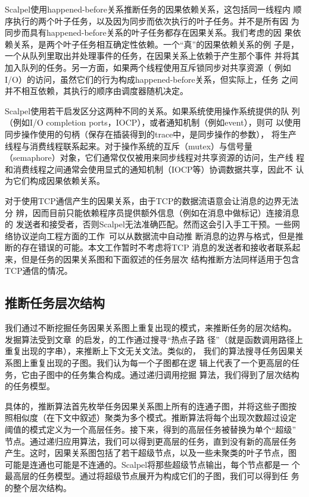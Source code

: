 Scalpel使用happened-before关系推断任务的因果依赖关系，这包括同一线程内
顺序执行的两个叶子任务，以及因为同步而依次执行的叶子任务。并不是所有因
为同步而具有happened-before关系的叶子任务都存在因果关系。我们考虑的因
果依赖关系，是两个叶子任务相互确定性依赖。一个“真”的因果依赖关系的例
子是，一个从队列里取出并处理事件的任务，在因果关系上依赖于产生那个事件
并将其加入队列的任务。另一方面，如果两个线程使用互斥锁同步对共享资源（
例如I/O）的访问，虽然它们的行为构成happened-before关系，但实际上，任务
之间并不相互依赖，其执行的顺序由调度器随机决定。

Scalpel使用若干启发区分这两种不同的关系。如果系统使用操作系统提供的队
列（例如I/O completion ports，IOCP），或者通知机制（例如event），则可
以使用同步操作使用的句柄（保存在插装得到的trace中，是同步操作的参数），
将生产线程与消费线程联系起来。对于操作系统的互斥（mutex）与信号量
（semaphore）对象，它们通常仅仅被用来同步线程对共享资源的访问，生产线
程和消费线程之间通常会使用显式的通知机制（IOCP等）协调数据共享，因此不
认为它们构成因果依赖关系。

对于使用TCP通信产生的因果关系，由于TCP的数据流语意会让消息的边界无法分
辨，因而目前只能依赖程序员提供额外信息（例如在消息中做标记）连接消息的
发送者和接受者，否则Scalpel无法准确匹配。然而这会引入手工干预。一些网
络协议逆向工程方面的工作~\cite{scalpel4, scalpel8}可以从数据流中自动推
断消息的边界与格式，但是推断的存在错误的可能。本文工作暂时不考虑将TCP
消息的发送者和接收者联系起来，但是任务的因果关系图和下面叙述的任务层次
结构推断方法同样适用于包含TCP通信的情况。

\subsection{推断任务层次结构}

我们通过不断挖掘任务因果关系图上重复出现的模式，来推断任务的层次结构。
发掘算法受到文章~\cite{wpp}的启发，\cite{wpp}的工作通过搜寻“热点子路
径”（就是函数调用路径上重复出现的字串），来推断上下文无关文法。类似的，
我们的算法搜寻任务因果关系图上重复出现的子图。我们认为每一个子图都在逻
辑上代表了一个更高层的任务，它由子图中的任务集合构成。通过递归调用挖掘
算法，我们得到了层次结构的任务模型。

具体的，推断算法首先枚举任务因果关系图上所有的连通子图，并将这些子图按
照相似度（在下文中叙述）聚类为多个模式。推断算法将每个出现次数超过设定
阈值的模式定义为一个高层任务。接下来，得到的高层任务被替换为单个“超级”
节点。通过递归应用算法，我们可以得到更高层的任务，直到没有新的高层任务
产生。这时，因果关系图包括了若干超级节点，以及一些未聚类的叶子节点，图
可能是连通也可能是不连通的。Scalpel将那些超级节点输出，每个节点都是一
个最高层的任务模型。通过将超级节点展开为构成它们的子图，我们可以得到任
务的整个层次结构。

